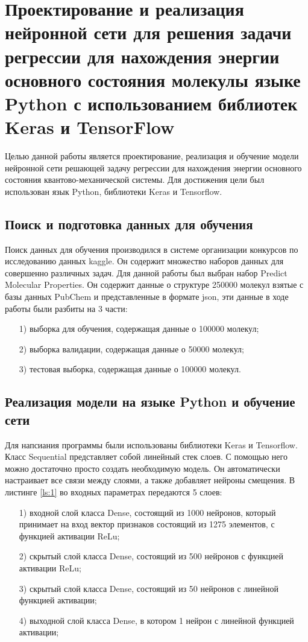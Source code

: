 \chapter{Проектирование и реализация нейронной сети для решения задачи регрессии для нахождения энергии основного состояния молекулы языке Python с использованием библиотек Keras и TensorFlow}
Целью данной работы является проектирование, реализация и обучение модели нейронной сети решающей задачу регрессии для нахождения энергии основного состояния квантово-механической системы. Для достижения цели был использован язык Python, библиотеки Keras и Tensorflow.
\section{Поиск и подготовка данных для обучения}
Поиск данных для обучения производился в системе организации конкурсов по исследованию данных kaggle. Он содержит множество наборов данных для совершенно различных задач. Для данной работы был выбран набор Predict Molecular Properties. Он содержит данные о структуре 250000 молекул взятые с базы данных PubChem и представленные в формате json, эти данные в ходе работы были разбиты на 3 части:
\begin{enumerate}
    \item [1)] выборка для обучения, содержащая данные о 100000 молекул;
    \item [2)] выборка валидации, содержащая данные о 50000 молекул;
    \item [3)] тестовая выборка, содержащая данные о 100000 молекул.
\end{enumerate}


\newpage


\section{Реализация модели на языке Python и обучение сети}
Для напсиания программы были использованы библиотеки Keras и Tensorflow. Класс Sequential представляет собой линейный стек слоев. С помощью него можно достаточно просто создать необходимую модель. Он автоматически настраивает все связи между слоями, а также добавляет нейроны смещения. В листинге \ref{ls:1} во входных параметрах передаются 5 слоев:
\begin{enumerate} 
  \item[1)] входной слой класса Dense, состоящий из 1000 нейронов, который принимает на вход вектор признаков состоящий из 1275 элементов, с функцией активации ReLu;
  \item[2)] скрытый слой класса Dense, состоящий из 500 нейронов с функцией активации ReLu;
  \item[3)] скрытый слой класса Dense, состоящий из 50 нейронов с линейной функцией активации;
  \item[4)] выходной слой класса Dense, в котором 1 нейрон с линейной функцией активации;
\end{enumerate}

